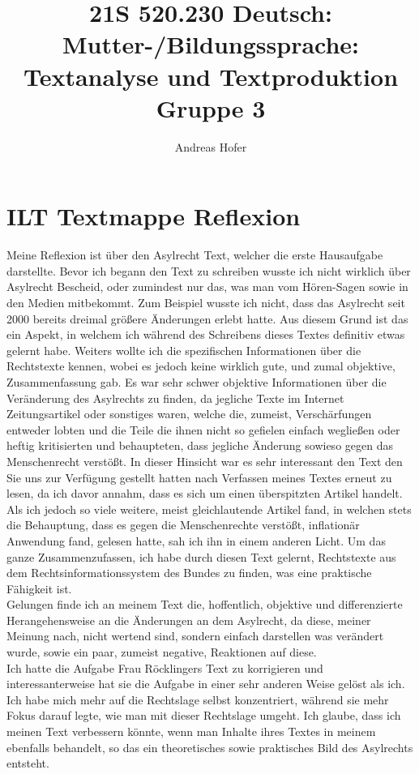 \documentclass{article}
\title{\vspace{-3cm}21S 520.230 Deutsch: Mutter-/Bildungssprache: Textanalyse und Textproduktion Gruppe 3}
\author{Andreas Hofer}
\begin{document}
\section*{ILT Textmappe Reflexion}
Meine Reflexion ist über den Asylrecht Text, welcher die erste Hausaufgabe darstellte. Bevor ich begann den Text zu schreiben wusste ich nicht wirklich über Asylrecht Bescheid, oder zumindest nur das, was man vom Hören-Sagen sowie in den Medien mitbekommt. Zum Beispiel wusste ich nicht, dass das Asylrecht seit 2000 bereits dreimal größere Änderungen erlebt hatte. Aus diesem Grund ist das ein Aspekt, in welchem ich während des Schreibens dieses Textes definitiv etwas gelernt habe. Weiters wollte ich die spezifischen Informationen über die Rechtstexte kennen, wobei es jedoch keine wirklich gute, und zumal objektive, Zusammenfassung gab. Es war sehr schwer objektive Informationen über die Veränderung des Asylrechts zu finden, da jegliche Texte im Internet Zeitungsartikel oder sonstiges waren, welche die, zumeist, Verschärfungen entweder lobten und die Teile die ihnen nicht so gefielen einfach wegließen oder heftig kritisierten und behaupteten, dass jegliche Änderung sowieso gegen das Menschenrecht verstößt. In dieser Hinsicht war es sehr interessant den Text den Sie uns zur Verfügung gestellt hatten nach Verfassen meines Textes erneut zu lesen, da ich davor annahm, dass es sich um einen überspitzten Artikel handelt. Als ich jedoch so viele weitere, meist gleichlautende Artikel fand, in welchen stets die Behauptung, dass es gegen die Menschenrechte verstößt, inflationär Anwendung fand, gelesen hatte, sah ich ihn in einem anderen Licht. Um das ganze Zusammenzufassen, ich habe durch diesen Text gelernt, Rechtstexte aus dem Rechtsinformationssystem des Bundes zu finden, was eine praktische Fähigkeit ist. \\
Gelungen finde ich an meinem Text die, hoffentlich, objektive und differenzierte Herangehensweise an die Änderungen an dem Asylrecht, da diese, meiner Meinung nach, nicht wertend sind, sondern einfach darstellen was verändert wurde, sowie ein paar, zumeist negative, Reaktionen auf diese.  \\
Ich hatte die Aufgabe Frau Röcklingers Text zu korrigieren und interessanterweise hat sie die Aufgabe in einer sehr anderen Weise gelöst als ich. Ich habe mich mehr auf die Rechtslage selbst konzentriert, während sie mehr Fokus darauf legte, wie man mit dieser Rechtslage umgeht. Ich glaube, dass ich meinen Text verbessern könnte, wenn man Inhalte ihres Textes in meinem ebenfalls behandelt, so das ein theoretisches sowie praktisches Bild des Asylrechts entsteht. \\
	
\end{document}
